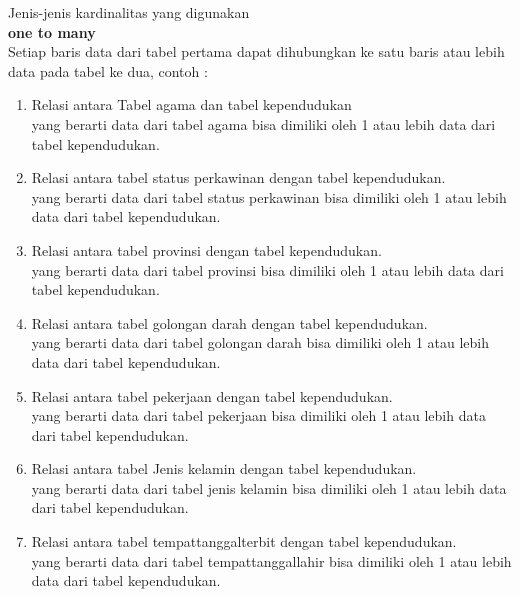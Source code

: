\documentclass[12pt,a4paper,bahasa]{article}
\begin{document}
Jenis-jenis kardinalitas yang digunakan \\
\textbf{one to many} \\
 Setiap baris data dari tabel pertama dapat dihubungkan ke satu baris atau lebih data pada tabel ke dua, contoh : \\	
 \begin{enumerate}
\item 	Relasi antara Tabel agama dan tabel kependudukan\\
yang berarti data dari tabel agama bisa dimiliki oleh 1 atau lebih data dari tabel kependudukan.\\

\item	Relasi antara tabel status perkawinan dengan tabel kependudukan.\\
yang berarti data dari tabel status perkawinan bisa dimiliki oleh 1 atau lebih data dari tabel kependudukan.\\

\item Relasi antara tabel provinsi dengan tabel kependudukan.\\
yang berarti data dari tabel provinsi bisa dimiliki oleh 1 atau lebih data dari tabel kependudukan.\\

\item Relasi antara tabel golongan darah dengan tabel kependudukan.\\
yang berarti data dari tabel golongan darah bisa dimiliki oleh 1 atau lebih data dari tabel kependudukan.\\

\item Relasi antara tabel pekerjaan dengan tabel kependudukan.\\
yang berarti data dari tabel pekerjaan bisa dimiliki oleh 1 atau lebih data dari tabel kependudukan.\\

\item Relasi antara tabel Jenis kelamin dengan tabel kependudukan.\\
yang berarti data dari tabel jenis kelamin bisa dimiliki oleh 1 atau lebih data dari tabel kependudukan.\\

\item Relasi antara tabel tempattanggalterbit dengan tabel kependudukan.\\
yang berarti data dari tabel tempattanggallahir bisa dimiliki oleh 1 atau lebih data dari tabel kependudukan.\\


\end{enumerate}
\end{document}
